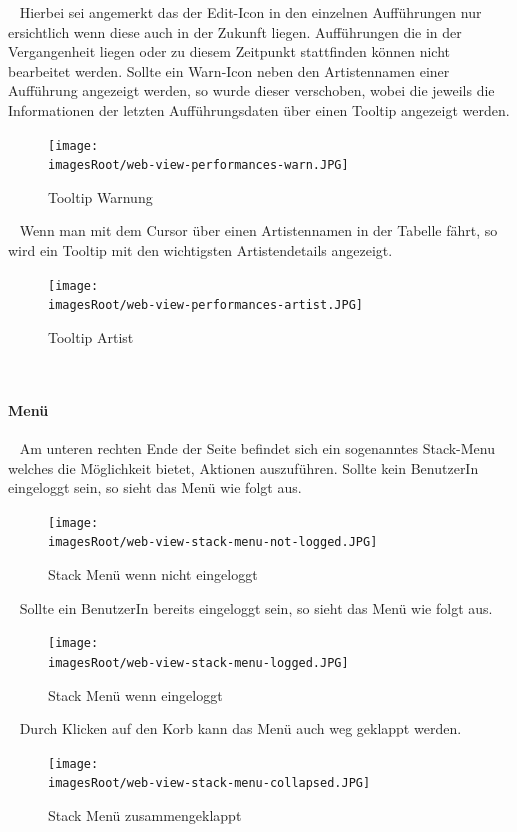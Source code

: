 \documentclass[11pt, a4paper, twoside]{article}   	%
\newcommand{\imagesRoot}{images}
\begin{document}
\ \newline
Hierbei sei angemerkt das der Edit-Icon in den einzelnen Aufführungen nur ersichtlich wenn diese auch in der Zukunft liegen. Aufführungen die in der Vergangenheit liegen oder zu diesem Zeitpunkt stattfinden können nicht bearbeitet werden.
\newpage
Sollte ein Warn-Icon neben den Artistennamen einer Aufführung angezeigt werden, so wurde dieser verschoben, wobei die jeweils die Informationen der letzten Aufführungsdaten über einen Tooltip angezeigt werden.
\begin{figure}[h]
	\centering
	\texttt{[image: \\imagesRoot/web-view-performances-warn.JPG]}
	\caption
	{Tooltip Warnung}
\end{figure}
\ \newline
Wenn man mit dem Cursor über einen Artistennamen in der Tabelle fährt, so wird ein Tooltip mit den wichtigsten Artistendetails angezeigt.
\begin{figure}[h]
	\centering
	\texttt{[image: \\imagesRoot/web-view-performances-artist.JPG]}
	\caption
	{Tooltip Artist}
\end{figure}
\ \newpage

\paragraph{Menü}
\ \newline 
Am unteren rechten Ende der Seite befindet sich ein sogenanntes Stack-Menu welches die Möglichkeit bietet, Aktionen auszuführen.
\newline
\newline
Sollte kein BenutzerIn eingeloggt sein, so sieht das Menü wie folgt aus.
\begin{figure}[h]
	\centering
	\texttt{[image: \\imagesRoot/web-view-stack-menu-not-logged.JPG]}
	\caption
	{Stack Menü wenn nicht eingeloggt}
\end{figure}
\ \newline
Sollte ein BenutzerIn bereits eingeloggt sein, so sieht das Menü wie folgt aus.
\begin{figure}[h]
	\centering
	\texttt{[image: \\imagesRoot/web-view-stack-menu-logged.JPG]}
	\caption
	{Stack Menü wenn eingeloggt}
\end{figure}
\ \newline
Durch Klicken auf den Korb kann das Menü auch weg geklappt werden.
\begin{figure}[h]
	\centering
	\texttt{[image: \\imagesRoot/web-view-stack-menu-collapsed.JPG]}
	\caption
	{Stack Menü zusammengeklappt}
\end{figure}
\ \newpage
\end{document}
